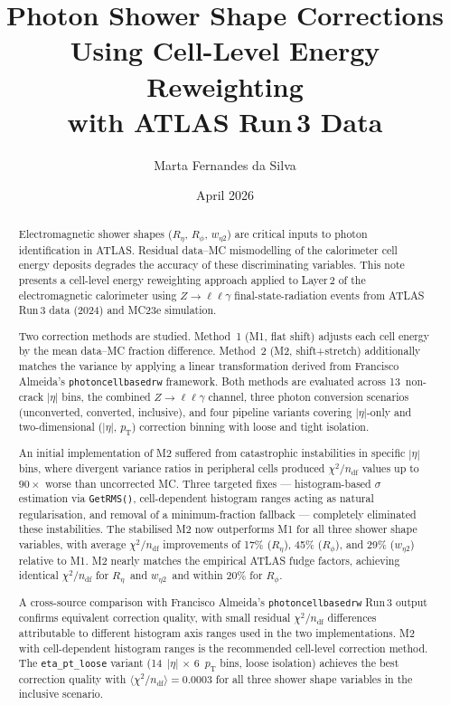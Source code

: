 \documentclass[11pt,a4paper]{article}
\title{Photon Shower Shape Corrections Using Cell-Level Energy Reweighting\\
       with ATLAS Run\,3 Data}
\author{Marta Fernandes da Silva}
\date{April 2026}
\newcommand{\Reta}{\ensuremath{R_{\eta}}}
\newcommand{\Rphi}{\ensuremath{R_{\phi}}}
\newcommand{\weta}{\ensuremath{w_{\eta 2}}}
\newcommand{\abseta}{\ensuremath{|\eta|}}
\newcommand{\chisq}{\ensuremath{\chi^2 / n_{\mathrm{df}}}}
\newcommand{\pt}{\ensuremath{p_{\mathrm{T}}}}
\begin{document}
\maketitle

\begin{abstract}
Electromagnetic shower shapes (\Reta, \Rphi, \weta) are critical inputs to
photon identification in ATLAS.  Residual data--MC mismodelling of the
calorimeter cell energy deposits degrades the accuracy of these
discriminating variables.  This note presents a cell-level energy
reweighting approach applied to Layer\,2 of the electromagnetic
calorimeter using $Z \to \ell\ell\gamma$ final-state-radiation events from
ATLAS Run\,3 data (2024) and MC23e simulation.

Two correction methods are studied.  Method~1 (M1, flat shift) adjusts
each cell energy by the mean data--MC fraction difference.  Method~2
(M2, shift+stretch) additionally matches the variance by applying a
linear transformation derived from Francisco Almeida's
\texttt{photoncellbasedrw} framework.  Both methods are evaluated across
13~non-crack $\abseta$ bins, the combined $Z \to \ell\ell\gamma$ channel,
three photon conversion scenarios (unconverted, converted, inclusive),
and four pipeline variants covering $\abseta$-only and two-dimensional
($\abseta$, $\pt$) correction binning with loose and tight isolation.

An initial implementation of M2 suffered from catastrophic instabilities
in specific $\abseta$ bins, where divergent variance ratios in peripheral
cells produced $\chisq$ values up to $90\times$ worse than uncorrected MC.
Three targeted fixes --- histogram-based $\sigma$ estimation via
\texttt{GetRMS()}, cell-dependent histogram ranges acting as natural
regularisation, and removal of a minimum-fraction fallback --- completely
eliminated these instabilities.  The stabilised M2 now outperforms M1 for
all three shower shape variables, with average $\chisq$ improvements of
17\% (\Reta), 45\% (\Rphi), and 29\% (\weta) relative to M1.  M2 nearly
matches the empirical ATLAS fudge factors, achieving identical $\chisq$ for
\Reta\ and \weta\ and within 20\% for \Rphi.

A cross-source comparison with Francisco Almeida's
\texttt{photoncellbasedrw} Run\,3 output confirms equivalent correction
quality, with small residual $\chisq$ differences attributable to
different histogram axis ranges used in the two implementations.
M2 with cell-dependent histogram ranges is the recommended cell-level
correction method.  The \texttt{eta\_pt\_loose} variant (14~$\abseta$
$\times$ 6~$\pt$ bins, loose isolation) achieves the best correction
quality with $\langle\chisq\rangle = 0.0003$ for all three shower shape
variables in the inclusive scenario.
\end{abstract}
\end{document}
